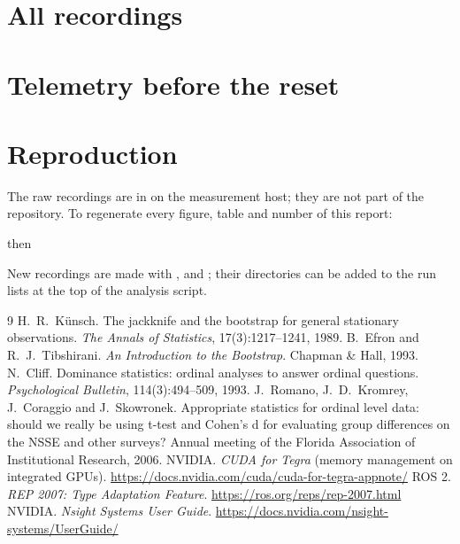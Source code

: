\documentclass[11pt,a4paper]{article}
\begin{document}
\appendix
\section{All recordings}\label{app:campaign}
{\scriptsize\setlength{\tabcolsep}{3pt}
}
\label{tab:campaign}

\section{Telemetry before the reset}\label{app:reset}
\begin{table}[H]
\centering\small
\caption{The last tegrastats samples before the board reset (ONNX Runtime CUDA EP in the Kilted container).}
\label{tab:reset}

\end{table}

\section{Reproduction}
The raw recordings are in  on the measurement host; they are not part of the repository. To
regenerate every figure, table and number of this report:
\begin{center}
\qquad then\qquad {}
\end{center}
New recordings are made with ,  and ; their
directories can be added to the run lists at the top of the analysis script.

\begin{thebibliography}{9}\small
{} H.~R.~K\"unsch. The jackknife and the bootstrap for general stationary observations.
  \emph{The Annals of Statistics}, 17(3):1217--1241, 1989.
 B.~Efron and R.~J.~Tibshirani. \emph{An Introduction to the Bootstrap}. Chapman \& Hall, 1993.
 N.~Cliff. Dominance statistics: ordinal analyses to answer ordinal questions.
  \emph{Psychological Bulletin}, 114(3):494--509, 1993.
 J.~Romano, J.~D.~Kromrey, J.~Coraggio and J.~Skowronek. Appropriate statistics for ordinal level
  data: should we really be using t-test and Cohen's d for evaluating group differences on the NSSE and other surveys?
  Annual meeting of the Florida Association of Institutional Research, 2006.
 NVIDIA. \emph{CUDA for Tegra} (memory management on integrated GPUs).
  \url{https://docs.nvidia.com/cuda/cuda-for-tegra-appnote/}
 ROS 2. \emph{REP 2007: Type Adaptation Feature}. \url{https://ros.org/reps/rep-2007.html}
 NVIDIA. \emph{Nsight Systems User Guide}. \url{https://docs.nvidia.com/nsight-systems/UserGuide/}
\end{thebibliography}
\end{document}
